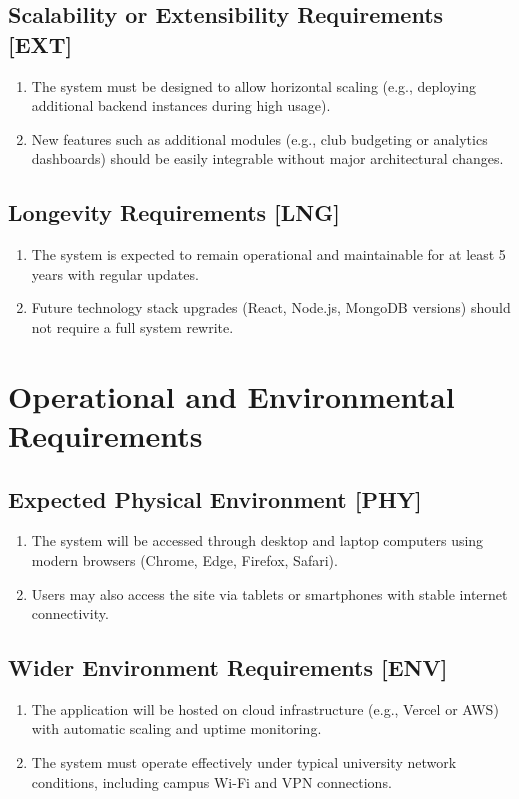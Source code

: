 \documentclass[12pt]{article}
\begin{document}
  \subsection{Scalability or Extensibility Requirements [EXT]}
    \begin{enumerate}
        \item The system must be designed to allow horizontal scaling (e.g., deploying additional backend instances during high usage).
        \item New features such as additional modules (e.g., club budgeting or analytics dashboards) should be easily integrable without major architectural changes.
    \end{enumerate}

  \subsection{Longevity Requirements [LNG]}
    \begin{enumerate}
        \item The system is expected to remain operational and maintainable for at least 5 years with regular updates.
        \item Future technology stack upgrades (React, Node.js, MongoDB versions) should not require a full system rewrite.
    \end{enumerate}

\section{Operational and Environmental Requirements}
  \subsection{Expected Physical Environment [PHY]}
    \begin{enumerate}
      \item The system will be accessed through desktop and laptop computers using modern browsers (Chrome, Edge, Firefox, Safari).
      \item Users may also access the site via tablets or smartphones with stable internet connectivity.
    \end{enumerate}

  \subsection{Wider Environment Requirements [ENV]}
    \begin{enumerate}
      \item The application will be hosted on cloud infrastructure (e.g., Vercel or AWS) with automatic scaling and uptime monitoring.
      \item The system must operate effectively under typical university network conditions, including campus Wi-Fi and VPN connections.
    \end{enumerate}
\end{document}
